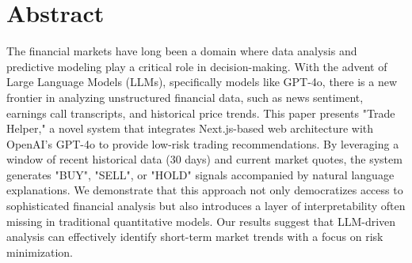 \section*{Abstract}
The financial markets have long been a domain where data analysis and predictive modeling play a critical role in decision-making. With the advent of Large Language Models (LLMs), specifically models like GPT-4o, there is a new frontier in analyzing unstructured financial data, such as news sentiment, earnings call transcripts, and historical price trends. This paper presents "Trade Helper," a novel system that integrates Next.js-based web architecture with OpenAI's GPT-4o to provide low-risk trading recommendations. By leveraging a window of recent historical data (30 days) and current market quotes, the system generates "BUY", "SELL", or "HOLD" signals accompanied by natural language explanations. We demonstrate that this approach not only democratizes access to sophisticated financial analysis but also introduces a layer of interpretability often missing in traditional quantitative models. Our results suggest that LLM-driven analysis can effectively identify short-term market trends with a focus on risk minimization.
